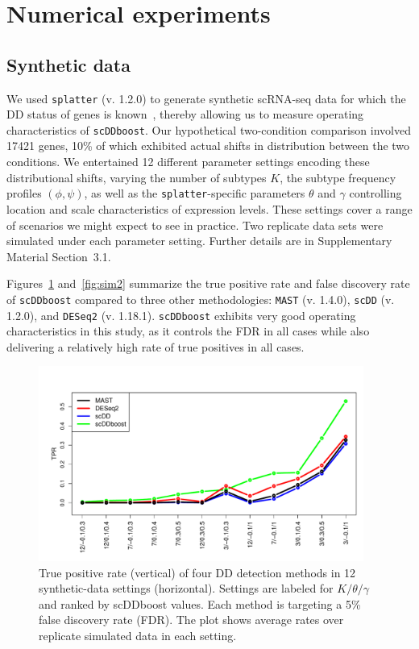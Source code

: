 \documentclass[aoas,preprint]{imsart}
\begin{document}
 
\section{Numerical experiments}

\subsection{Synthetic data} 
We used \verb+splatter+ (v. 1.2.0)  
to generate synthetic scRNA-seq  data for which the DD status of genes is known~\citep{ref:Zappia}, 
 thereby allowing us to 
measure operating characteristics of \verb+scDDboost+.  Our hypothetical two-condition comparison involved
17421 genes, 10\% of which exhibited actual shifts in distribution between the two conditions. 
We entertained 12 different parameter settings encoding these distributional shifts, 
varying the number of subtypes $K$, the subtype frequency profiles $(\phi,\psi)$, as well
as the  \verb+splatter+-specific parameters $\theta$ and $\gamma$ controlling location and scale characteristics
of expression levels. These settings cover a range
of scenarios we might expect to see in practice.  Two replicate data sets were simulated under each parameter setting.
Further details are in Supplementary Material Section~3.1.   

Figures~\ref{fig:sim1} and~\ref{fig:sim2} summarize the true positive rate and false discovery rate
of \verb+scDDboost+ compared to three other methodologies: \verb+MAST+ (v. 1.4.0), \verb+scDD+ (v. 1.2.0), and 
\verb+DESeq2+ (v. 1.18.1). 
\verb+scDDboost+ exhibits very good operating characteristics in this study, as it controls the 
FDR in all cases while also delivering a relatively high rate of true positives in all cases.


\begin{figure}[H]
  \includegraphics[width = 0.95\textwidth]{Figs/simuTPR.pdf}
  \caption{True positive rate (vertical) of four DD detection methods in 12 synthetic-data settings (horizontal). 
  Settings are labeled for $K / \theta / \gamma$  and ranked by scDDboost values. Each method
 is targeting a 5\% false discovery rate (FDR). The plot shows  average rates over replicate simulated data
 in each setting.
   }
  \label{fig:sim1}
\end{figure}
\end{document}
